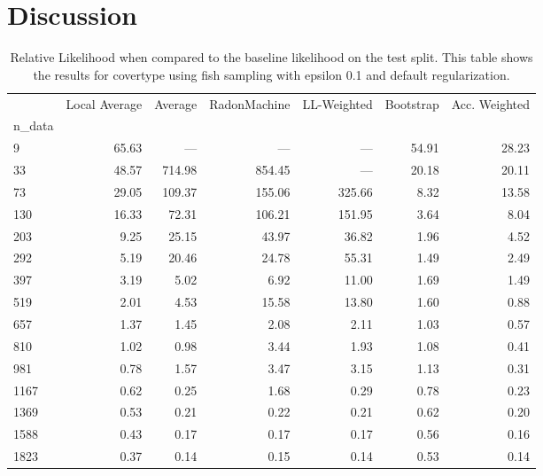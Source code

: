 \section{Discussion}
\label{sec:results}
\begin{table}
    \centering
    \caption{Relative Likelihood when compared to the baseline likelihood on the test split. This table shows the results for covertype using  fish sampling with epsilon  0.1 and  default regularization.}
    \label{tab:0}
    \begin{tabular}{|l||r|rrr|rr|}
    \toprule
    {} &  Local Average &  Average &  RadonMachine &  LL-Weighted &  Bootstrap &  Acc. Weighted \\
    n\_data &                &         &               &              &            &                \\
    \midrule
    9      &          65.63 &      --- &           --- &          --- &      54.91 &          28.23 \\
    33     &          48.57 &   714.98 &        854.45 &          --- &      20.18 &          20.11 \\
    73     &          29.05 &   109.37 &        155.06 &       325.66 &       8.32 &          13.58 \\
    130    &          16.33 &    72.31 &        106.21 &       151.95 &       3.64 &           8.04 \\
    203    &           9.25 &    25.15 &         43.97 &        36.82 &       1.96 &           4.52 \\
    292    &           5.19 &    20.46 &         24.78 &        55.31 &       1.49 &           2.49 \\
    397    &           3.19 &     5.02 &          6.92 &        11.00 &       1.69 &           1.49 \\
    519    &           2.01 &     4.53 &         15.58 &        13.80 &       1.60 &           0.88 \\
    657    &           1.37 &     1.45 &          2.08 &         2.11 &       1.03 &           0.57 \\
    810    &           1.02 &     0.98 &          3.44 &         1.93 &       1.08 &           0.41 \\
    981    &           0.78 &     1.57 &          3.47 &         3.15 &       1.13 &           0.31 \\
    1167   &           0.62 &     0.25 &          1.68 &         0.29 &       0.78 &           0.23 \\
    1369   &           0.53 &     0.21 &          0.22 &         0.21 &       0.62 &           0.20 \\
    1588   &           0.43 &     0.17 &          0.17 &         0.17 &       0.56 &           0.16 \\
    1823   &           0.37 &     0.14 &          0.15 &         0.14 &       0.53 &           0.14 \\
    \bottomrule
    \end{tabular}
    \end{table}
    
